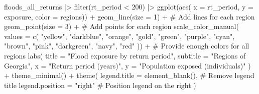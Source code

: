 \documentclass[
  letterpaper,
  DIV=11,
  numbers=noendperiod]{scrartcl}
\newenvironment{Shaded}{}{}
\newcommand{\AttributeTok}[1]{\textcolor[rgb]{0.84,0.23,0.29}{#1}}
\newcommand{\CommentTok}[1]{\textcolor[rgb]{0.42,0.45,0.49}{#1}}
\newcommand{\DecValTok}[1]{\textcolor[rgb]{0.00,0.36,0.77}{#1}}
\newcommand{\FunctionTok}[1]{\textcolor[rgb]{0.44,0.26,0.76}{#1}}
\newcommand{\NormalTok}[1]{\textcolor[rgb]{0.14,0.16,0.18}{#1}}
\newcommand{\SpecialCharTok}[1]{\textcolor[rgb]{0.00,0.36,0.77}{#1}}
\newcommand{\StringTok}[1]{\textcolor[rgb]{0.01,0.18,0.38}{#1}}
\begin{document}
\begin{Shaded}
\begin{Highlighting}[]
\NormalTok{floods\_all\_returns }\SpecialCharTok{|\textgreater{}} 
  \FunctionTok{filter}\NormalTok{(rt\_period }\SpecialCharTok{\textless{}} \DecValTok{200}\NormalTok{) }\SpecialCharTok{|\textgreater{}} 
  \FunctionTok{ggplot}\NormalTok{(}\FunctionTok{aes}\NormalTok{(}
    \AttributeTok{x =}\NormalTok{ rt\_period, }
    \AttributeTok{y =}\NormalTok{ exposure, }
    \AttributeTok{color =}\NormalTok{ regions)) }\SpecialCharTok{+}
  \FunctionTok{geom\_line}\NormalTok{(}\AttributeTok{size =} \DecValTok{1}\NormalTok{) }\SpecialCharTok{+}                      \CommentTok{\# Add lines for each region}
  \FunctionTok{geom\_point}\NormalTok{(}\AttributeTok{size =} \DecValTok{3}\NormalTok{) }\SpecialCharTok{+}                     \CommentTok{\# Add points for each region}
  \FunctionTok{scale\_color\_manual}\NormalTok{(}
    \AttributeTok{values =} \FunctionTok{c}\NormalTok{(}
      \StringTok{"yellow"}\NormalTok{,    }\StringTok{"darkblue"}\NormalTok{, }\StringTok{"orange"}\NormalTok{, }
      \StringTok{"gold"}\NormalTok{,      }\StringTok{"green"}\NormalTok{,    }\StringTok{"purple"}\NormalTok{, }
      \StringTok{"cyan"}\NormalTok{,      }\StringTok{"brown"}\NormalTok{,    }\StringTok{"pink"}\NormalTok{, }
      \StringTok{"darkgreen"}\NormalTok{, }\StringTok{"navy"}\NormalTok{,     }\StringTok{"red"}
\NormalTok{  )) }\SpecialCharTok{+}                                       \CommentTok{\# Provide enough colors for all regions}
  \FunctionTok{labs}\NormalTok{(}
    \AttributeTok{title =} \StringTok{"Flood exposure by return period"}\NormalTok{,}
    \AttributeTok{subtitle =} \StringTok{"Regions of Georgia"}\NormalTok{,}
    \AttributeTok{x =} \StringTok{"Return period (years)"}\NormalTok{,}
    \AttributeTok{y =} \StringTok{"Population exposed (individuals)"}
\NormalTok{  ) }\SpecialCharTok{+}
  \FunctionTok{theme\_minimal}\NormalTok{() }\SpecialCharTok{+}
  \FunctionTok{theme}\NormalTok{(}
    \AttributeTok{legend.title =} \FunctionTok{element\_blank}\NormalTok{(),          }\CommentTok{\# Remove legend title}
    \AttributeTok{legend.position =} \StringTok{"right"}                \CommentTok{\# Position legend on the right}
\NormalTok{  )}
\end{Highlighting}
\end{Shaded}
\end{document}
